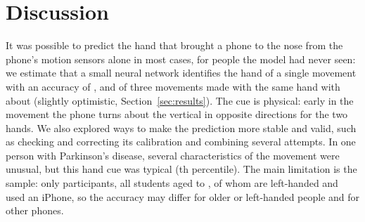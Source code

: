 \section{Discussion}\label{sec:discussion}

It was possible to predict the hand that brought a phone to the nose from the phone's motion sensors alone in most
cases, for people the model had never seen: we estimate that a small neural network identifies the hand of a single
movement with an accuracy of , and of three movements made with the same hand with about
 (slightly optimistic, Section~\ref{sec:results}). The cue is
physical: early in the movement the phone turns about the vertical in opposite directions for the two hands. We also
explored ways to make the prediction more stable and valid, such as checking and correcting its calibration and
combining several attempts. In one person with Parkinson's disease, several characteristics of the movement were
unusual, but this hand cue was typical (th percentile). The main limitation is the sample: only 
participants, all students aged  to , of whom  are
left-handed and  used an iPhone, so the accuracy may differ for older or left-handed people and
for other phones.
